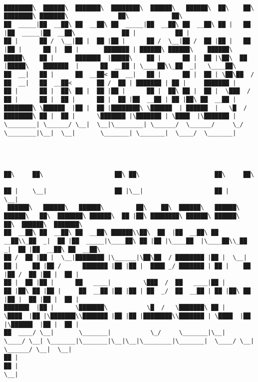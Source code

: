 \documentclass[varwidth=\maxdimen,margin=0.5cm,multi={verbatim}]{standalone}
\begin{document}
\begin{verbatim}

████████\  ██████\  ███████\  ████████\  ██████\   ██████\  ██\    ██\ ████████\ ███████\              ██\            ██\
██  _____|██  __██\ ██  __██\ ██  _____|██  __██\ ██  __██\ ██ |   ██ |██  _____|██  __██\             ██ |           ██ |
██ |      ██ /  \__|██ |  ██ |██ |      ██ /  \__|██ /  ██ |██ |   ██ |██ |      ██ |  ██ |       ███████ | ██████\ ██████\    ██████\
█████\    ██ |      ███████  |█████\    ██ |      ██ |  ██ |\██\  ██  |█████\    ███████  |      ██  __██ | \____██\\_██  _|   \____██\
██  __|   ██ |      ██  __██< ██  __|   ██ |      ██ |  ██ | \██\██  / ██  __|   ██  __██<       ██ /  ██ | ███████ | ██ |     ███████ |
██ |      ██ |  ██\ ██ |  ██ |██ |      ██ |  ██\ ██ |  ██ |  \███  /  ██ |      ██ |  ██ |      ██ |  ██ |██  __██ | ██ |██\ ██  __██ |
████████\ \██████  |██ |  ██ |████████\ \██████  | ██████  |   \█  /   ████████\ ██ |  ██ |      \███████ |\███████ | \████  |\███████ |
\________| \______/ \__|  \__|\________| \______/  \______/     \_/    \________|\__|  \__|       \_______| \_______|  \____/  \_______|



                                                                     ██\     ██\                    ██\ ██\                     ██\     ██\
                                                                     ██ |    \__|                   ██ |\__|                    ██ |    \__|
 ██████\   ██████\   ██████\         ██\    ██\  ██████\   ██████\ ██████\   ██\  ███████\ ██████\  ██ |██\ ████████\ ██████\ ██████\   ██\  ██████\  ███████\
██  __██\ ██  __██\ ██  __██\ ██████\\██\  ██  |██  __██\ ██  __██\\_██  _|  ██ |██  _____|\____██\ ██ |██ |\____██  |\____██\\_██  _|  ██ |██  __██\ ██  __██\
██ /  ██ |██ |  \__|████████ |\______|\██\██  / ████████ |██ |  \__| ██ |    ██ |██ /      ███████ |██ |██ |  ████ _/ ███████ | ██ |    ██ |██ /  ██ |██ |  ██ |
██ |  ██ |██ |      ██   ____|         \███  /  ██   ____|██ |       ██ |██\ ██ |██ |     ██  __██ |██ |██ | ██  _/  ██  __██ | ██ |██\ ██ |██ |  ██ |██ |  ██ |
███████  |██ |      \███████\           \█  /   \███████\ ██ |       \████  |██ |\███████\\███████ |██ |██ |████████\\███████ | \████  |██ |\██████  |██ |  ██ |
██  ____/ \__|       \_______|           \_/     \_______|\__|        \____/ \__| \_______|\_______|\__|\__|\________|\_______|  \____/ \__| \______/ \__|  \__|
██ |
██ |
\__|





\end{verbatim}
\end{document}
